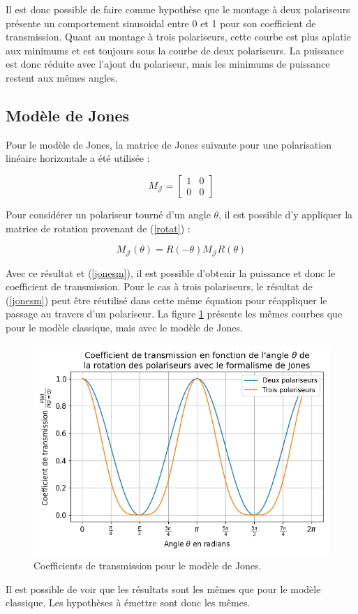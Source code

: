 \documentclass[11pt,letterpaper]{article}
\begin{document}
Il est donc possible de faire comme hypothèse que le montage à deux polariseurs présente un comportement
sinusoidal entre 0 et 1 pour son coefficient de transmission. Quant au montage à trois polariseurs, cette
courbe est plus aplatie aux minimums et est toujours sous la courbe de deux polariseurs. La puissance est
donc réduite avec l'ajout du polariseur, mais les minimums de puissance restent aux mêmes angles.

\subsection{Modèle de Jones}

Pour le modèle de Jones, la matrice de Jones suivante pour une polarisation linéaire horizontale a été utilisée :

\begin{equation}
  M_{\mathcal{J}} = \begin{bmatrix}
    1 & 0 \\
    0 & 0
  \end{bmatrix}
\end{equation}

Pour considérer un polariseur tourné d'un angle $\theta$, il est possible d'y appliquer la matrice de rotation provenant
de (\ref{rotat}) :

\begin{equation}
  M_{\mathcal{J}}\left( \theta \right)= R\left( -\theta \right)M_{\mathcal{J}}R\left( \theta \right)
\end{equation}


Avec ce résultat et (\ref{jonesm}), il est possible d'obtenir la puissance et donc le coefficient de transmission. Pour le cas à
trois polariseurs, le résultat de (\ref{jonesm}) peut être réutilisé dans cette même équation pour réappliquer le
passage au travers d'un polariseur. La figure \ref{jones} présente les mêmes courbes que pour le modèle classique, mais avec le modèle de Jones.

\begin{figure}[H]
  \centering
  \includegraphics[scale=0.7]{coeff_jones.png}
  \caption{Coefficients de transmission pour le modèle de Jones.}
  \label{jones}
\end{figure}

Il est possible de voir que les résultats sont les mêmes que pour le modèle classique. Les hypothèses à émettre
sont donc les mêmes.

\clearpage



\end{document}
